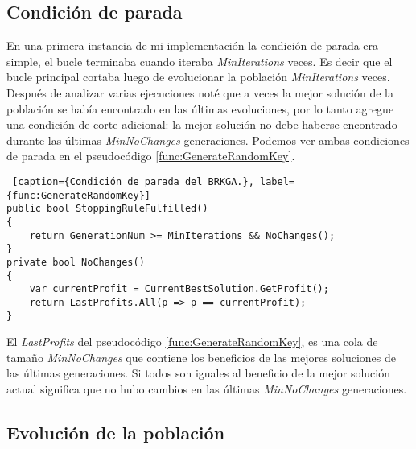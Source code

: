 \subsection{Condición de parada}

En una primera instancia de mi implementación la condición de parada era simple, el bucle terminaba cuando iteraba \textit{MinIterations} veces. Es decir que el bucle principal cortaba luego de evolucionar la población \textit{MinIterations} veces. Después de analizar varias ejecuciones noté que a veces la mejor solución de la población se había encontrado en las últimas evoluciones, por lo tanto agregue una condición de corte adicional: la mejor solución no debe haberse encontrado durante las últimas \textit{MinNoChanges} generaciones. Podemos ver ambas condiciones de parada en el pseudocódigo \ref{func:GenerateRandomKey}.

\bigskip

\begin{minipage}{\textwidth}
\begin{lstlisting} [caption={Condición de parada del BRKGA.}, label={func:GenerateRandomKey}]
public bool StoppingRuleFulfilled()
{ 
    return GenerationNum >= MinIterations && NoChanges();
}
private bool NoChanges()
{
	var currentProfit = CurrentBestSolution.GetProfit();
	return LastProfits.All(p => p == currentProfit);
}
\end{lstlisting}
\end{minipage}

El \textit{LastProfits} del pseudocódigo \ref{func:GenerateRandomKey}, es una cola de tamaño \textit{MinNoChanges} que contiene los beneficios de las mejores soluciones de las últimas generaciones. Si todos son iguales al beneficio de la mejor solución actual significa que no hubo cambios en las últimas \textit{MinNoChanges} generaciones.

\subsection{Evolución de la población}

